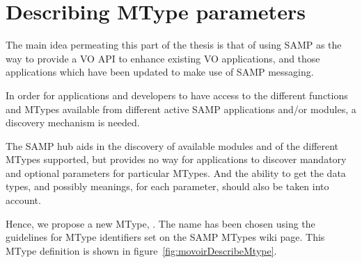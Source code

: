 		
	
	\section{Describing MType parameters} %
	\label{sec:describing_mtype_parameters}
		
		The main idea permeating this part of the thesis is that
		of using SAMP as the way to provide a VO API to enhance
		existing VO applications, and those applications which
		have been updated to make use of SAMP messaging.
		
		In order for applications and developers to have access
		to the different functions and MTypes available from
		different active SAMP applications and/or modules,
		a discovery mechanism is needed.
		
		The SAMP hub aids in the discovery of available modules
		and of the different MTypes supported, but provides no way
		for applications to discover mandatory and optional
		parameters for particular MTypes. And the ability to get
		the data types, and possibly meanings, for each parameter,
		should also be taken into account.
		
		Hence, we propose a new MType,
		. The name has been chosen
		using the guidelines for MType identifiers set on
		the SAMP MTypes wiki page\urlnote{\sampmtypesurl}. This
		MType definition is shown in
		figure~\ref{fig:movoirDescribeMtype}.
		
